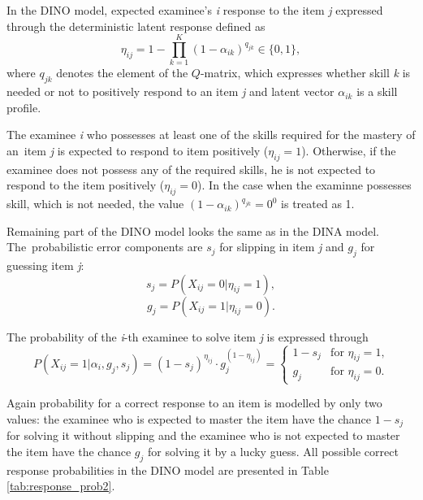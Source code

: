 \documentclass[english]{pwr_wmat_praca_dyplomowa}
\theoremstyle{plain}
\numberwithin{theorem}{chapter}
\theoremstyle{definition}
\numberwithin{theorem}{chapter}
\begin{document}
	In the DINO model, expected examinee's \textit{i} response to the item \textit{j} expressed through the deterministic latent response defined as
	\begin{equation}
	\eta_{ij} = 1- \prod\limits_{k=1}^{K} \left( 1 - \alpha_{ik} \right)^{q_{jk}} \in \{0,1\},
	\end{equation}
	where $q_{jk}$ denotes the element of the $Q$-matrix, which expresses whether skill \textit{k} is needed or not to positively respond to an item \textit{j} and latent vector $\alpha_{ik}$ is a skill profile.
	
	The examinee \textit{i} who possesses at least one of the skills required for the mastery of an~item \textit{j} is expected to respond to item positively ($\eta_{ij} = 1$). Otherwise, if the examinee does not possess any of the required skills, he is not expected to respond to the item positively ($\eta_{ij} = 0$). In the case when the examinne possesses skill, which is not needed, the value $\left(1 - \alpha_{ik} \right)^{q_{jk}} = 0^0$ is treated as 1.
	
	Remaining part of the DINO model looks the same as in the DINA model. The~probabilistic error components are $s_j$ for slipping in item \textit{j} and $g_j$ for guessing item \textit{j}:
	\begin{equation}
	s_j = P(X_{ij} = 0 | \eta_{ij} = 1),
	\end{equation}
	\begin{equation}
	g_j = P(X_{ij} = 1 | \eta_{ij} = 0).
	\end{equation}
	
	\noindent The probability of the \textit{i}-th examinee to solve item \textit{j} is expressed through
	\begin{equation}
	P(X_{ij} = 1 | \alpha_i, g_j, s_j) = (1-s_j)^{\eta_{ij}} \cdot g_j^{(1-\eta_{ij})} = \left\{ \begin{array}{ll}
	1 - s_j & \textrm{for $\eta_{ij} = 1$,} \\
	g_j & \textrm{for $\eta_{ij} = 0$.} 
	\end{array}\right.
	\end{equation}
	
	Again probability for a correct response to an item is modelled by only two values: the examinee who is expected to master the item have the chance $1 - s_j$ for solving it without slipping and the examinee who is not expected to master the item have the chance $g_j$ for solving it by a lucky guess. All possible correct response probabilities in the DINO model are presented in Table \ref{tab:response_prob2}.
	
\end{document}
